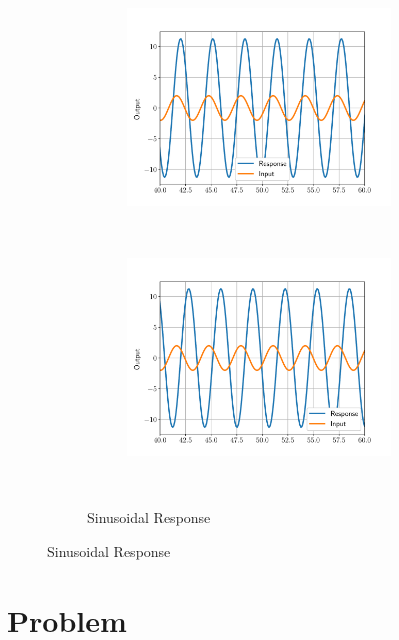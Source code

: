 \documentclass[11pt, reqno]{article}    %
\begin{document}
\begin{figure}[htbp]
\begin{subfigure}{0.4\textwidth}
\begin{subfigure}[htbp]{\textwidth}
            \includegraphics[width=\textwidth]{figures/G2_sinusoidal.pdf} 
        \end{subfigure} \\
        \begin{subfigure}[htbp]{\textwidth} 
            \includegraphics[width=\textwidth]{figures/G3_response.pdf} 
        \end{subfigure} 
        \caption{Sinusoidal Response}~\label{fig:sinusoidal_match}
    \end{subfigure}
\end{figure}
\clearpage

\section{Problem}
\end{document}
